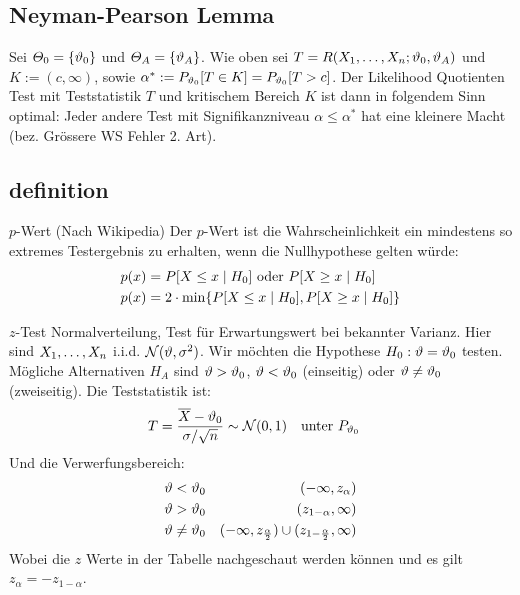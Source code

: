\subsection{Neyman-Pearson Lemma}
Sei $\varTheta_0 = \{\vartheta_0\}$ und $\varTheta_A = \{\vartheta_A\}$. Wie oben sei $T =
  R (X_1, \dots, X_n; \vartheta_0, \vartheta_A)$ und $K := (c, \infty)$, sowie $\alpha^* :=
  P_{\vartheta_0}[T \in K] = P_{\vartheta_0}[T > c]$. Der Likelihood Quotienten Test mit
Teststatistik $T$ und kritischem Bereich $K$ ist dann in folgendem Sinn
optimal: Jeder andere Test mit Signifikanzniveau $\alpha \leq \alpha^*$ hat
eine kleinere Macht (bez. Grössere WS Fehler 2. Art).
\subsection{definition}{$p$-Wert}
(Nach Wikipedia) Der $p$-Wert ist die Wahrscheinlichkeit ein mindestens
so extremes Testergebnis zu erhalten, wenn die Nullhypothese gelten würde:
\begin{align*}
  p (x) & = P[X \leq x \; | \; H_0] \text{   oder   } P[X \geq x \; | \; H_0]   \\
  p (x) & = 2 \cdot \min \{ P[X \leq x \; | \; H_0], P[X \geq x \; | \; H_0] \}
\end{align*}
\begin{definition}{$z$-Test}
\color{red}Normalverteilung, Test für Erwartungswert bei bekannter Varianz. \color{black} Hier sind
$X_1, \dots, X_n$ i.i.d. $\mathcal{N} (\vartheta, \sigma^2)$. Wir möchten die
Hypothese $H_0 : \vartheta = \vartheta_0$ testen. Mögliche Alternativen $H_A$ sind $\vartheta >
  \vartheta_0$, $\vartheta < \vartheta_0$ (einseitig) oder $\vartheta \neq \vartheta_0$ (zweiseitig). Die
Teststatistik ist:
\begin{align*}
  T & = \frac{\overline{X} - \vartheta_0}{\sigma / \sqrt{n}} \sim \mathcal{N} (0, 1)
    &                                                                               & \text{unter } P_{\vartheta_0}
\end{align*}
Und die Verwerfungsbereich:
\begin{align*}
  \vartheta < \vartheta_0    &  & (-\infty, z_\alpha)                                                      \\
  \vartheta > \vartheta_0    &  & (z_{1 - \alpha}, \infty)                                                 \\
  \vartheta \neq \vartheta_0 &  & (-\infty, z_{\frac{\alpha}{2}}) \cup  (z_{1 - \frac{\alpha}{2}}, \infty)
\end{align*}
Wobei die $z$ Werte in der Tabelle nachgeschaut werden können
und es gilt $z_\alpha = - z_{1 - \alpha}$.
\end{definition}
\BoxStart{}

